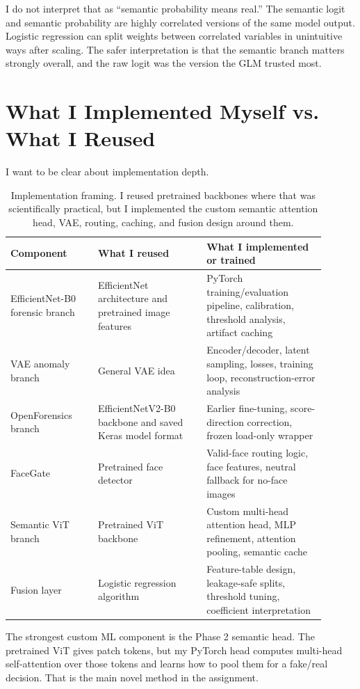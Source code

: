 \documentclass[11pt]{article}
\begin{document}
I do not interpret that as ``semantic probability means real.'' The semantic logit and semantic probability are highly correlated versions of the same model output. Logistic regression can split weights between correlated variables in unintuitive ways after scaling. The safer interpretation is that the semantic branch matters strongly overall, and the raw logit was the version the GLM trusted most.

\section{What I Implemented Myself vs. What I Reused}

I want to be clear about implementation depth.

\begin{table}[H]
\centering
\begin{tabular}{p{0.25\linewidth}p{0.31\linewidth}p{0.34\linewidth}}
\toprule
Component & What I reused & What I implemented or trained \\
\midrule
EfficientNet-B0 forensic branch & EfficientNet architecture and pretrained image features & PyTorch training/evaluation pipeline, calibration, threshold analysis, artifact caching \\
VAE anomaly branch & General VAE idea & Encoder/decoder, latent sampling, losses, training loop, reconstruction-error analysis \\
OpenForensics branch & EfficientNetV2-B0 backbone and saved Keras model format & Earlier fine-tuning, score-direction correction, frozen load-only wrapper \\
FaceGate & Pretrained face detector & Valid-face routing logic, face features, neutral fallback for no-face images \\
Semantic ViT branch & Pretrained ViT backbone & Custom multi-head attention head, MLP refinement, attention pooling, semantic cache \\
Fusion layer & Logistic regression algorithm & Feature-table design, leakage-safe splits, threshold tuning, coefficient interpretation \\
\bottomrule
\end{tabular}
\caption{Implementation framing. I reused pretrained backbones where that was scientifically practical, but I implemented the custom semantic attention head, VAE, routing, caching, and fusion design around them.}
\label{tab:implementation-depth}
\end{table}

The strongest custom ML component is the Phase 2 semantic head. The pretrained ViT gives patch tokens, but my PyTorch head computes multi-head self-attention over those tokens and learns how to pool them for a fake/real decision. That is the main novel method in the assignment.
\end{document}
